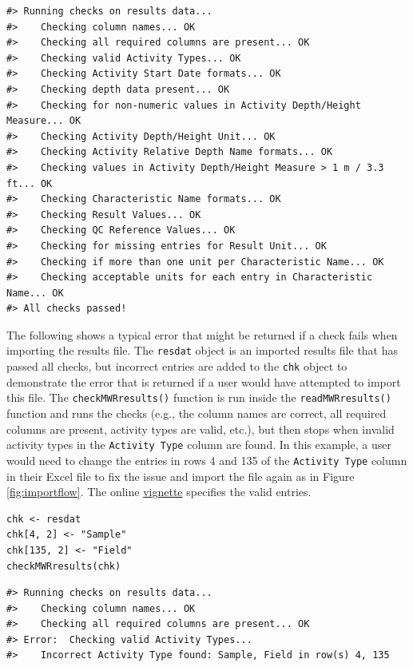 \begin{verbatim}
#> Running checks on results data...
#>    Checking column names... OK
#>    Checking all required columns are present... OK
#>    Checking valid Activity Types... OK
#>    Checking Activity Start Date formats... OK
#>    Checking depth data present... OK
#>    Checking for non-numeric values in Activity Depth/Height Measure... OK
#>    Checking Activity Depth/Height Unit... OK
#>    Checking Activity Relative Depth Name formats... OK
#>    Checking values in Activity Depth/Height Measure > 1 m / 3.3 ft... OK
#>    Checking Characteristic Name formats... OK
#>    Checking Result Values... OK
#>    Checking QC Reference Values... OK
#>    Checking for missing entries for Result Unit... OK
#>    Checking if more than one unit per Characteristic Name... OK
#>    Checking acceptable units for each entry in Characteristic Name... OK
#> All checks passed!
\end{verbatim}

The following shows a typical error that might be returned if a check fails when importing the results file. The \texttt{resdat} object is an imported results file that has passed all checks, but incorrect entries are added to the \texttt{chk} object to demonstrate the error that is returned if a user would have attempted to import this file. The \texttt{checkMWRresults()} function is run inside the \texttt{readMWRresults()} function and runs the checks (e.g., the column names are correct, all required columns are present, activity types are valid, etc.), but then stops when invalid activity types in the \texttt{Activity\ Type} column are found. In this example, a user would need to change the entries in rows 4 and 135 of the \texttt{Activity\ Type} column in their Excel file to fix the issue and import the file again as in Figure \ref{fig:importflow}. The online \href{https://massbays-tech.github.io/MassWateR/articles/inputs.html\#data-import-and-checks}{vignette} specifies the valid entries.

\begin{verbatim}
chk <- resdat
chk[4, 2] <- "Sample"
chk[135, 2] <- "Field"
checkMWRresults(chk)
\end{verbatim}

\begin{verbatim}
#> Running checks on results data...
#>    Checking column names... OK
#>    Checking all required columns are present... OK
#> Error:  Checking valid Activity Types...
#>    Incorrect Activity Type found: Sample, Field in row(s) 4, 135
\end{verbatim}

